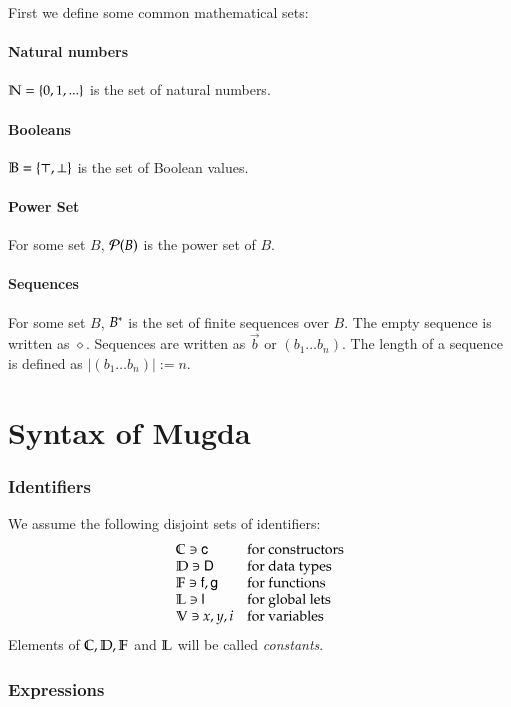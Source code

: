 First we define some common mathematical sets:
\paragraph*{Natural numbers}
$ \mathbb{N} = \{ 0 , 1 , ... \} $ is the set of natural numbers.
\paragraph*{Booleans}
$ \mathbb{B} = \{ \top, \bot \} $ is the set of Boolean values.
\paragraph*{Power Set}
For some set $B$, $\mathcal{P}(B)$ is the power set of $B$.
\paragraph*{Sequences}
For some set $B$, ${B}^{\ast}$ is the set of finite sequences over $B$.
The empty sequence is written as $\diamond$.
Sequences are written as $\vec{b}$ or $(b_1 \ldots b_n)$.
The length of a sequence is defined as $\vert(b_1 \ldots b_n)\vert := n $. 
\section{Syntax of Mugda}

\subsubsection{Identifiers}
We assume the following disjoint sets of identifiers:
\[
\begin{array}{ll}
\mathbb{C} \ni \mathsf{c} & \mbox{for constructors}\\
\mathbb{D} \ni \mathsf{D} & \mbox{for data types}\\
\mathbb{F} \ni \mathsf{f} , \mathsf{g} & \mbox{for functions}\\
\mathbb{L} \ni \mathsf{l} & \mbox{for global lets}\\
\mathbb{V} \ni x,y,i & \mbox{for variables}
\end{array}
\]
Elements of $\mathbb{C}, \mathbb{D} , \mathbb{F}$ and $\mathbb{L}$ will be called \emph{constants}.


\subsubsection{Expressions}

